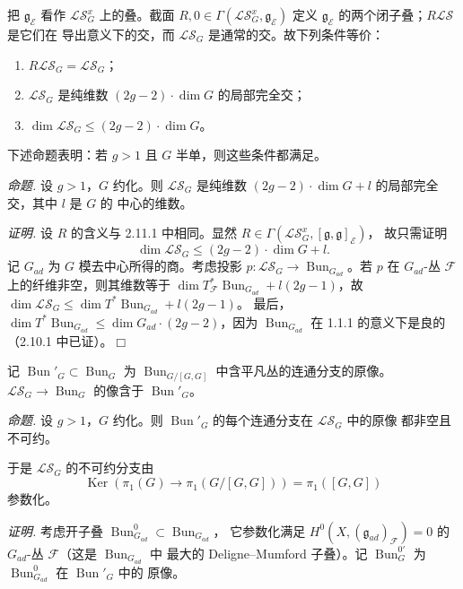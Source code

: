 把 $\mathfrak{g}_{\mathcal{E}}$ 看作 $\mathcal{LS}_G^x$ 上的叠。截面
$R,0\in\Gamma(\mathcal{LS}_G^x,\mathfrak{g}_{\mathcal{E}})$ 定义
$\mathfrak{g}_{\mathcal{E}}$ 的两个闭子叠；$R\mathcal{LS}$ 是它们在
导出意义下的交，而 $\mathcal{LS}_G$ 是通常的交。故下列条件等价：
\begin{enumerate}[label=\arabic*),leftmargin=2.2em]
\item $R\mathcal{LS}_G=\mathcal{LS}_G$；
\item $\mathcal{LS}_G$ 是纯维数 $(2g-2)\cdot\dim G$ 的局部完全交；
\item $\dim\mathcal{LS}_G\le(2g-2)\cdot\dim G$。
\end{enumerate}

下述命题表明：若 $g>1$ 且 $G$ 半单，则这些条件都满足。

 \emph{命题.} 设 $g>1$，$G$ 约化。则 $\mathcal{LS}_G$
是纯维数 $(2g-2)\cdot\dim G+l$ 的局部完全交，其中 $l$ 是 $G$ 的
中心的维数。

\emph{证明.} 设 $R$ 的含义与 2.11.1 中相同。显然
$R\in\Gamma(\mathcal{LS}_G^x,[\mathfrak{g},\mathfrak{g}]_{\mathcal{E}})$，
故只需证明
\begin{equation}\tag{42}
  \dim\mathcal{LS}_G\le(2g-2)\cdot\dim G+l.
\end{equation}
记 $G_{ad}$ 为 $G$ 模去中心所得的商。考虑投影
$p:\mathcal{LS}_G\to\operatorname{Bun}_{G_{ad}}$。若 $p$ 在
$G_{ad}$-丛 $\mathcal{F}$ 上的纤维非空，则其维数等于
$\dim T^{*}_{\mathcal{F}}\operatorname{Bun}_{G_{ad}}+l(2g-1)$，故
$\dim\mathcal{LS}_G\le\dim T^{*}\operatorname{Bun}_{G_{ad}}+l(2g-1)$。
最后，$\dim T^{*}\operatorname{Bun}_{G_{ad}}
\le\dim G_{ad}\cdot(2g-2)$，因为 $\operatorname{Bun}_{G_{ad}}$ 在
1.1.1 的意义下是良的（2.10.1 中已证）。\hfill$\Box$

 记 $\operatorname{Bun}'_G\subset\operatorname{Bun}_G$
为 $\operatorname{Bun}_{G/[G,G]}$ 中含平凡丛的连通分支的原像。
$\mathcal{LS}_G\to\operatorname{Bun}_G$ 的像含于
$\operatorname{Bun}'_G$。

 \emph{命题.} 设 $g>1$，$G$ 约化。则
$\operatorname{Bun}'_G$ 的每个连通分支在 $\mathcal{LS}_G$ 中的原像
都非空且不可约。

于是 $\mathcal{LS}_G$ 的不可约分支由
\[
  \operatorname{Ker}(\pi_1(G)\to\pi_1(G/[G,G]))=\pi_1([G,G])
\]
参数化。

\emph{证明.} 考虑开子叠
$\operatorname{Bun}^0_{G_{ad}}\subset\operatorname{Bun}_{G_{ad}}$，
它参数化满足 $H^0(X,(\mathfrak{g}_{ad})_{\mathcal{F}})=0$ 的
$G_{ad}$-丛 $\mathcal{F}$（这是 $\operatorname{Bun}_{G_{ad}}$ 中
最大的 Deligne--Mumford 子叠）。记 $\operatorname{Bun}^{0\prime}_G$
为 $\operatorname{Bun}^0_{G_{ad}}$ 在 $\operatorname{Bun}'_G$ 中的
原像。

